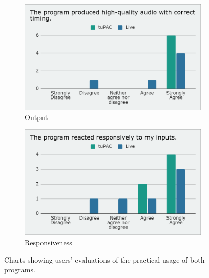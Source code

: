\documentclass[12pt,a4paper,oneside,openright]{report}
\begin{document}
\begin{figure}[h!]
\centering
\begin{subfigure}{.5\textwidth}
  \centering
  \includegraphics[width=.9\linewidth]{images/questionnaire/functionality.png}
  \caption{Output}
  \label{fig:q_funct}
\end{subfigure}%
\begin{subfigure}{.5\textwidth}
  \centering
  \includegraphics[width=.9\linewidth]{images/questionnaire/responsiveness.png}
  \caption{Responsiveness}
  \label{fig:q_resp}
\end{subfigure}
\caption{Charts showing users' evaluations of the practical usage of both programs.}
\label{fig:q_1}
\end{figure}
\end{document}

